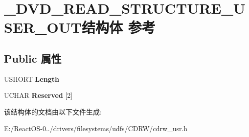 \hypertarget{struct___d_v_d___r_e_a_d___s_t_r_u_c_t_u_r_e___u_s_e_r___o_u_t}{}\section{\+\_\+\+D\+V\+D\+\_\+\+R\+E\+A\+D\+\_\+\+S\+T\+R\+U\+C\+T\+U\+R\+E\+\_\+\+U\+S\+E\+R\+\_\+\+O\+U\+T结构体 参考}
\label{struct___d_v_d___r_e_a_d___s_t_r_u_c_t_u_r_e___u_s_e_r___o_u_t}
\subsection*{Public 属性}
\begin{DoxyCompactItemize}
\item 
\mbox{\label{struct___d_v_d___r_e_a_d___s_t_r_u_c_t_u_r_e___u_s_e_r___o_u_t_a5089d40029e9fbca96484c701b6178a6}} 
U\+S\+H\+O\+RT {\bfseries Length}
\item 
\mbox{\label{struct___d_v_d___r_e_a_d___s_t_r_u_c_t_u_r_e___u_s_e_r___o_u_t_a354d4e7c33ebb9ec0858ca136e1f8554}} 
U\+C\+H\+AR {\bfseries Reserved} \mbox{[}2\mbox{]}
\end{DoxyCompactItemize}


该结构体的文档由以下文件生成\+:\begin{DoxyCompactItemize}
\item 
E\+:/\+React\+O\+S-\/0../drivers/filesystems/udfs/\+C\+D\+R\+W/cdrw\+\_\+usr.\+h\end{DoxyCompactItemize}
